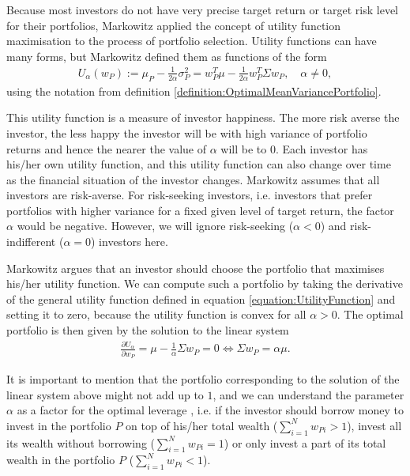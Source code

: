    Because most investors do not have very precise target return or target risk level for their portfolios, Markowitz applied the concept of utility function maximisation to the process of portfolio selection. Utility functions can have many forms, but Markowitz defined them as functions of the form
    \begin{align}\label{equation:UtilityFunction}
        U_{\alpha}(w_P) := \mu_P - \frac{1}{2 \alpha} \sigma_P^2 = w_P^T \mu  - \frac{1}{2 \alpha} w_P^T \Sigma w_P, \quad \alpha \neq 0,
    \end{align}
    using the notation from definition \ref{definition:OptimalMeanVariancePortfolio}.
    
    This utility function is a measure of investor happiness. The more risk averse the investor, the less happy the investor will be with high variance of portfolio returns and hence the nearer the value of $\alpha$ will be to $0$. Each investor has his/her own utility function, and this utility function can also change over time as the financial situation of the investor changes. Markowitz assumes that all investors are risk-averse. For risk-seeking investors, i.e. investors that prefer portfolios with higher variance for a fixed given level of target return, the factor $\alpha$ would be negative. However, we will ignore risk-seeking ($\alpha < 0$) and risk-indifferent ($\alpha = 0$) investors here.
    
    Markowitz argues that an investor should choose the portfolio that maximises his/her utility function. We can compute such a portfolio by taking the derivative of the general utility function defined in equation \ref{equation:UtilityFunction} and setting it to zero, because the utility function is convex for all $\alpha > 0$. The optimal portfolio is then given by the solution to the linear system
    \begin{align*}
        \frac{\partial U_{\alpha}}{\partial w_P} = \mu - \frac{1}{\alpha} \Sigma w_P = 0 \Leftrightarrow \Sigma w_P = \alpha \mu.
    \end{align*}
    
    It is important to mention that the portfolio corresponding to the solution of the linear system above might not add up to $1$, and we can understand the parameter $\alpha$ as a factor for the optimal leverage , i.e. if the investor should borrow money to invest in the portfolio $P$ on top of his/her total wealth ($\sum_{i=1}^N w_{Pi} > 1$), invest all its wealth without borrowing ($\sum_{i=1}^N w_{Pi} = 1$) or only invest a part of its total wealth in the portfolio $P$ ($\sum_{i=1}^N w_{Pi} < 1$).
    
